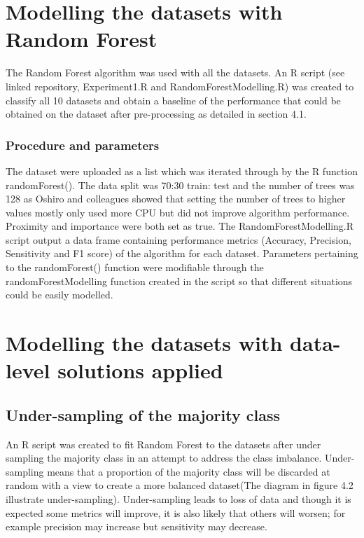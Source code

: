 \section{Modelling the datasets with Random Forest}
The Random Forest algorithm was used with all the datasets. 
An R script (see linked repository, Experiment1.R and RandomForestModelling.R) was created to classify all 10 datasets and obtain a baseline of the performance that could be obtained on the dataset after pre-processing as detailed in section 4.1.
\subsubsection{Procedure and parameters}
The dataset were uploaded as a list which was iterated through by the R function randomForest(). 
The data split was 70:30 train: test and the number of trees was 128 as Oshiro and colleagues showed that setting the number of trees to higher values mostly only used more CPU but did not improve algorithm performance\citep{MayumiOshiro:ve}. Proximity and importance were both set as true.\newline
The RandomForestModelling.R script output  a data frame containing performance metrics (Accuracy, Precision, Sensitivity and F1 score) of the algorithm for each dataset.\newline
Parameters pertaining to the randomForest() function were modifiable through the randomForestModelling function created in the script so that different situations could be easily modelled.


\section{Modelling the datasets with data-level solutions applied}
\subsection{Under-sampling of the majority class}
An R script was created to fit Random Forest to the datasets after under sampling the majority class in an attempt to address the class imbalance. 
Under-sampling means that a proportion of the majority class will be discarded at random with a view to create a more balanced dataset(The diagram in figure 4.2 illustrate under-sampling).\newline
Under-sampling leads to loss of data and though it is expected some metrics will improve, it is also likely that others will worsen; for example precision may increase but sensitivity may decrease.\newline

